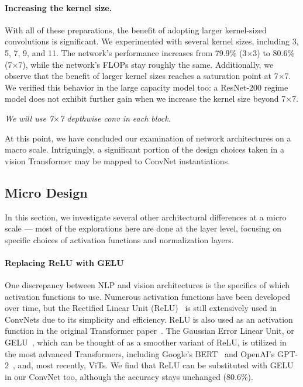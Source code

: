 \paragraph{Increasing the kernel size.}
With all of these preparations, the benefit of adopting larger kernel-sized convolutions is significant. We experimented with several kernel sizes, including 3, 5, 7, 9, and 11. The network's performance increases from 79.9\% (3$\times$3) to 80.6\% (7$\times$7), while the network's FLOPs stay roughly the same. Additionally, we observe that the benefit of larger kernel sizes reaches a saturation point at 7$\times$7. We verified this behavior in the large capacity model too: a ResNet-200 regime model does not exhibit further gain when we increase the kernel size beyond 7$\times$7. 

\textit{We will use 7$\times$7 depthwise conv in each block.} 

At this point, we have concluded our examination of network architectures on a macro scale. Intriguingly, a significant portion of the design choices taken in a vision Transformer may be mapped to ConvNet instantiations. 

\subsection{Micro Design}
In this section, we investigate several other architectural differences at a micro scale --- most of the explorations here are done at the layer level, focusing on specific choices of activation functions and normalization layers.  
\paragraph{Replacing ReLU with GELU}
One discrepancy between NLP and vision architectures is the specifics of which activation functions to use. Numerous activation functions have been developed over time, but the Rectified Linear Unit (ReLU)~\cite{Nair2010} is still extensively used in ConvNets due to its simplicity and efficiency. ReLU is also used as an activation function in the original Transformer paper~\cite{Vaswani2017}. The Gaussian Error Linear Unit, or GELU~\cite{Hendrycks2016}, which can be thought of as a smoother variant of ReLU, is utilized in the most advanced Transformers, including Google's BERT~\cite{Devlin2019} and OpenAI's GPT-2~\cite{Radford2019}, and, most recently, ViTs. We find that ReLU can be substituted with GELU in our ConvNet too, although the accuracy stays unchanged (80.6\%).
 


